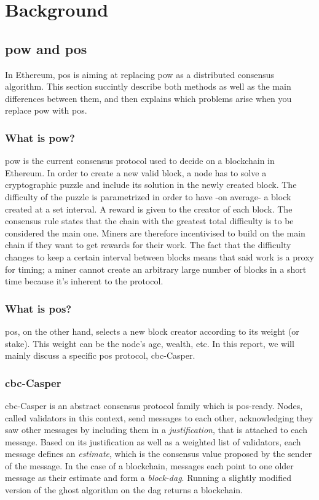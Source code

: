 \chapter{Background}
\label{chap:background}

\section{\gls{pow} and \gls{pos}}
In Ethereum, \gls{pos} is aiming at replacing \gls{pow} as a distributed
consensus algorithm. This section succintly describe both methods as well as the
main differences between them, and then explains which problems arise when you
replace \gls{pow} with \gls{pos}.

\subsection{What is \gls{pow}?}
\gls{pow} is the current consensus protocol used to decide on a blockchain in
Ethereum. In order to create a new valid block, a node has to solve a
cryptographic puzzle and include its solution in the newly created block. The
difficulty of the puzzle is parametrized in order to have -on average- a block
created at a set interval. A reward is given to the creator of each block.  The
consensus rule states that the chain with the greatest total difficulty is to be
considered the main one. Miners are therefore incentivised to build on the main
chain if they want to get rewards for their work. The fact that the difficulty
changes to keep a certain interval between blocks means that said work is a
proxy for timing; a miner cannot create an arbitrary large number of blocks in a
short time because it's inherent to the protocol.


\subsection{What is \gls{pos}?}
\gls{pos}, on the other hand, selects a new block creator according to its
weight (or stake). This weight can be the node's age, wealth, etc. In this
report, we will mainly discuss a specific \gls{pos} protocol, \gls{cbc}-Casper.

\subsection{\gls{cbc}-Casper}
\FloatBarrier
\gls{cbc}-Casper \cite{abstractCBC} \cite{abstractCBC2} is an abstract consensus
protocol family which is \gls{pos}-ready. Nodes, called validators in this
context, send messages to each other, acknowledging they saw other messages by
including them in a \textit{justification}, that is attached to each message.
Based on its justification as well as a weighted list of validators, each
message defines an \textit{estimate}, which is the consensus value proposed by
the sender of the message. In the case of a blockchain, messages each point to
one older message as their estimate and form a \textit{block-\gls{dag}}. Running
a slightly modified version of the \gls{ghost} algorithm on the \gls{dag}
\cite{abstractCBC} \cite{GHOST} returns a blockchain.

